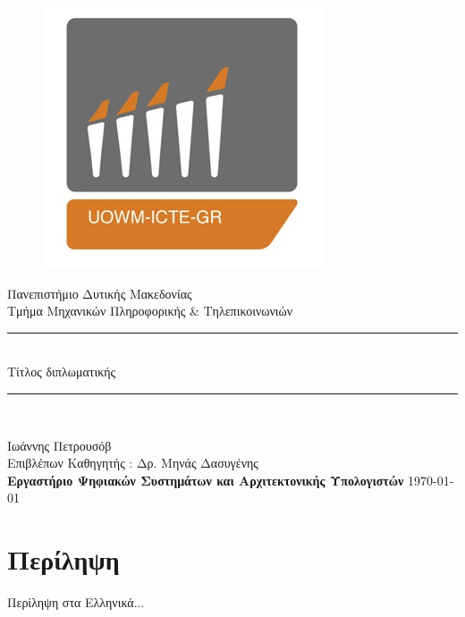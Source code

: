 \documentclass[12pt,a4paper]{report}%
\newcommand\blankpage{%
    \null
    \thispagestyle{empty}%
    \addtocounter{page}{-1}%
    \newpage}
\newcommand{\HRule}{\rule{\linewidth}{0.5mm}}
\begin{document}
\begin{titlepage}
\begin{center}
\begin{figure}[h]
\centering \includegraphics{icte.png}
\end{figure}
{\LARGE Πανεπιστήμιο Δυτικής 
Μακεδονίας\\}
{\Large Τμήμα Μηχανικών Πληροφορικής \&
Τηλεπικοινωνιών \\}

\begin{center}
\vspace{2cm}

\HRule \\[0.4cm]
{\huge Τίτλος διπλωματικής\\}
\HRule \\[0.4cm]
\end{center}

\vfill
\begin{doublespacing}

{\LARGE 
Ιωάννης Πετρουσόβ\\}
{\Large Επιβλέπων Καθηγητής : Δρ. Μηνάς Δασυγένης\\}
\textbf{\Large Εργαστήριο Ψηφιακών Συστημάτων και Αρχιτεκτονικής Υπολογιστών}
\vfill 
{\Large \today}
\end{doublespacing}
\end{center}
\end{titlepage}

\afterpage{\blankpage}


\newpage
\chapter*{Περίληψη}
Περίληψη στα Ελληνικά...
\end{document}

